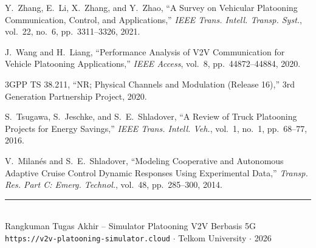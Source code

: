 \documentclass[12pt,a4paper]{article}
\begin{document}
\begin{enumerate}[label={[\arabic*]}]
  \item Y.~Zhang, E.~Li, X.~Zhang, and Y.~Zhao, ``A Survey on Vehicular Platooning
        Communication, Control, and Applications,'' \textit{IEEE Trans. Intell. Transp.
        Syst.}, vol.~22, no.~6, pp.~3311--3326, 2021.

  \item J.~Wang and H.~Liang, ``Performance Analysis of V2V Communication for Vehicle
        Platooning Applications,'' \textit{IEEE Access}, vol.~8, pp.~44872--44884, 2020.

  \item 3GPP TS 38.211, ``NR; Physical Channels and Modulation (Release 16),''
        3rd Generation Partnership Project, 2020.

  \item S.~Tsugawa, S.~Jeschke, and S.~E.~Shladover, ``A Review of Truck Platooning
        Projects for Energy Savings,'' \textit{IEEE Trans. Intell. Veh.}, vol.~1, no.~1,
        pp.~68--77, 2016.

  \item V.~Milanés and S.~E.~Shladover, ``Modeling Cooperative and Autonomous Adaptive
        Cruise Control Dynamic Responses Using Experimental Data,''
        \textit{Transp. Res. Part C: Emerg. Technol.}, vol.~48, pp.~285--300, 2014.
\end{enumerate}

\vfill
\begin{center}
  \small\color{gray}\rule{0.5\linewidth}{0.4pt}\\[0.3em]
  Rangkuman Tugas Akhir -- Simulator Platooning V2V Berbasis 5G\\
  \texttt{https://v2v-platooning-simulator.cloud} $\cdot$ Telkom University $\cdot$ 2026
\end{center}
\end{document}
